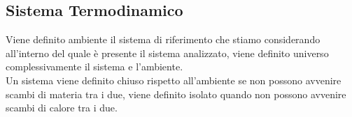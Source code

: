 \documentclass{article}
\numberwithin{equation}{subsection}
\begin{document}
\subsection{Sistema Termodinamico}
Viene definito ambiente il sistema di riferimento 
che stiamo considerando all'interno del quale è presente 
il sistema analizzato, viene definito universo complessivamente 
il sistema e l'ambiente. \\
Un sistema viene definito chiuso rispetto all'ambiente 
se non possono avvenire scambi di materia tra i due, viene 
definito isolato quando non possono avvenire scambi di calore 
tra i due.\\
\begin{center}\end{center}
\end{document}
